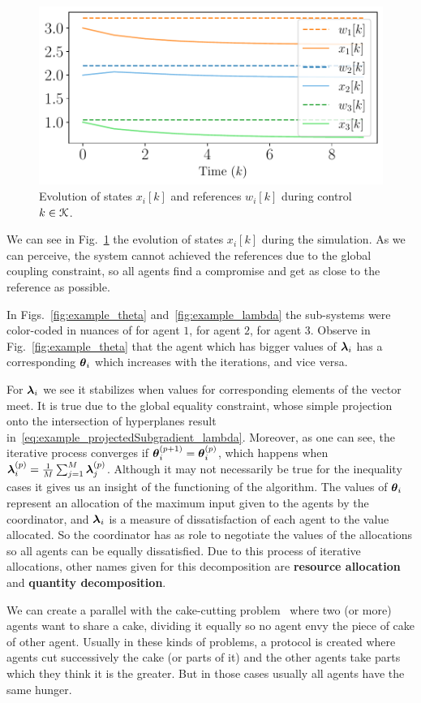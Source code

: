 \documentclass[../main.tex]{subfiles}
\begin{document}
\begin{figure}[h]
  \centering
  \includegraphics[width=.5\textwidth]{../img/example_state.pdf}
  \caption{Evolution of states $x_{i}[k]$ and references $w_{i}[k]$ during control ${k\in\mathcal{K}}$. }\label{fig:example_state}
\end{figure}
We can see in Fig.~\ref{fig:example_state} the evolution of states $x_{i}[k]$ during the simulation.
As we can perceive, the system cannot achieved the references due to the global coupling constraint, so all agents find a compromise and get as close to the reference as possible.

In Figs.~\ref{fig:example_theta} and~\ref{fig:example_lambda} the sub-systems were color-coded in nuances of  for agent $1$,  for agent $2$,  for agent $3$.
Observe in Fig.~\ref{fig:example_theta} that the agent which has bigger values of $\boldsymbol{\lambda}_i$ has a corresponding $\boldsymbol{\theta}_i$ which increases with the iterations, and vice versa.

For $\boldsymbol{\lambda}_i$ we see it stabilizes when values for corresponding elements of the vector meet.
It is true due to the global equality constraint, whose simple projection onto the intersection of hyperplanes result in~\eqref{eq:example_projectedSubgradient_lambda}.
Moreover, as one can see, the iterative process converges if ${\boldsymbol{\theta}_i^{(p+1)}=\boldsymbol{\theta}_i^{(p)}}$, which happens when ${\boldsymbol{\lambda}_i^{(p)}=\frac{1}{M}\sum_{j=1}^{M}\boldsymbol{\lambda}_j^{(p)}}$.
Although it may not necessarily be true for the inequality cases it gives us an insight of the functioning of the algorithm.
The values of $\boldsymbol{\theta}_i$ represent an allocation of the maximum input given to the agents by the coordinator, and $\boldsymbol{\lambda}_i$ is a measure of dissatisfaction of each agent to the value allocated.
So the coordinator has as role to negotiate the values of the allocations so all agents can be equally dissatisfied.
Due to this process of iterative allocations, other names given for this decomposition are \textbf{resource allocation} and \textbf{quantity decomposition}.

We can create a parallel with the cake-cutting problem~\cite{BramsTaylor1995} where two (or more) agents want to share a cake, dividing it equally so no agent envy the piece of cake of other agent.
Usually in these kinds of problems, a protocol is created where agents cut successively the cake (or parts of it) and the other agents take parts which they think it is the greater.
But in those cases usually all agents have the same hunger.
\end{document}
